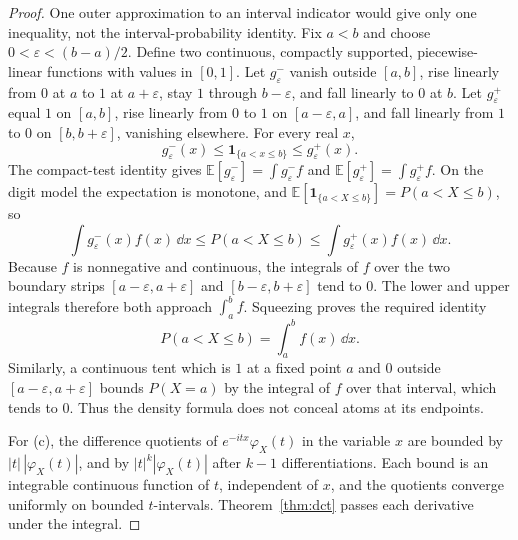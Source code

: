 \begin{proof}
One outer approximation to an interval indicator would give only one inequality, not the interval-probability identity. Fix $a<b$ and choose $0<\varepsilon<(b-a)/2$. Define two continuous, compactly supported, piecewise-linear functions with values in $[0,1]$. Let $g^-_\varepsilon$ vanish outside $[a,b]$, rise linearly from $0$ at $a$ to $1$ at $a+\varepsilon$, stay $1$ through $b-\varepsilon$, and fall linearly to $0$ at $b$. Let $g^+_\varepsilon$ equal $1$ on $[a,b]$, rise linearly from $0$ to $1$ on $[a-\varepsilon,a]$, and fall linearly from $1$ to $0$ on $[b,b+\varepsilon]$, vanishing elsewhere. For every real $x$,
\[
 g^-_\varepsilon(x)\le\mathbf1_{\{a<x\le b\}}\le g^+_\varepsilon(x).
\]
The compact-test identity gives $\mathbb E[g^-_\varepsilon]=\int g^-_\varepsilon f$ and $\mathbb E[g^+_\varepsilon]=\int g^+_\varepsilon f$. On the digit model the expectation is monotone, and $\mathbb E[\mathbf 1_{\{a<X\le b\}}]=P(a<X\le b)$, so
\[
 \int g^-_\varepsilon(x)f(x)\,\dd x
 \le P(a<X\le b)
 \le \int g^+_\varepsilon(x)f(x)\,\dd x.
\]
Because $f$ is nonnegative and continuous, the integrals of $f$ over the two boundary strips $[a-\varepsilon,a+\varepsilon]$ and $[b-\varepsilon,b+\varepsilon]$ tend to $0$. The lower and upper integrals therefore both approach $\int_a^b f$. Squeezing proves the required identity
\[
 P(a<X\le b)=\int_a^b f(x)\,\dd x.
\]
Similarly, a continuous tent which is $1$ at a fixed point $a$ and $0$ outside $[a-\varepsilon,a+\varepsilon]$ bounds $P(X=a)$ by the integral of $f$ over that interval, which tends to $0$. Thus the density formula does not conceal atoms at its endpoints.

For (c), the difference quotients of $e^{-itx}\varphi_X(t)$ in the variable $x$ are bounded by $|t|\,|\varphi_X(t)|$, and by $|t|^k|\varphi_X(t)|$ after $k-1$ differentiations. Each bound is an integrable continuous function of $t$, independent of $x$, and the quotients converge uniformly on bounded $t$-intervals. Theorem~\ref{thm:dct} passes each derivative under the integral.
\end{proof}

